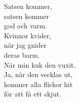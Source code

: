 
            Satsen kommer, \\
            satsen kommer \\
            god och varm. \\
            Kvinnor kvider, \\
            när jag gnider \\
            deras barm. \\
            När min kuk den vuxit. \\
            Ja, när den vecklas ut, \\
            kommer alla flickor hit \\
            för att få ett skjut. \\
